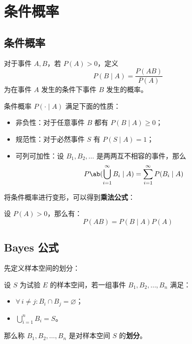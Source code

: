 \section{条件概率}

\subsection{条件概率}

\begin{definition}
    对于事件 $A, B$，若 $P(A) > 0$，定义
    $$
    P(B \mid A) = \frac{P(A B)}{P(A)}
    $$
    为在事件 $A$ 发生的条件下事件 $B$ 发生的概率。
\end{definition}

条件概率 $P(\cdot \mid A)$ 满足下面的性质：

\begin{itemize}
    \item 非负性：对于任意事件 $B$ 都有 $P(B \mid A) \ge 0$；
    \item 规范性：对于必然事件 $S$ 有 $P(S \mid A) = 1$；
    \item 可列可加性：设 $B_1, B_2,\dots$ 是两两互不相容的事件，那么
    $$
    P\ab(\bigcup_{i = 1}^{\infty} B_i \mid A) = \sum_{i = 1}^{\infty} P(B_i \mid A)
    $$
\end{itemize}

将条件概率进行变形，可以得到\textbf{乘法公式}：

\begin{theorem}[乘法定理]
    设 $P(A) > 0$，那么有：
    $$
    P(A B) = P(B \mid A) P(A)
    $$
\end{theorem}

\subsection{Bayes 公式}

先定义样本空间的划分：

\begin{definition}[划分]
    设 $S$ 为试验 $E$ 的样本空间，若一组事件 $B_1, B_2,\dots, B_n$ 满足：
    \begin{itemize}
        \item $\forall\,i \neq j: B_i \cap B_j = \varnothing$；
        \item $\displaystyle \bigcup_{i = 1}^{n} B_i = S$。
    \end{itemize}
    那么称 $B_1, B_2,\dots, B_n$ 是对样本空间 $S$ 的\textbf{划分}。
\end{definition}

